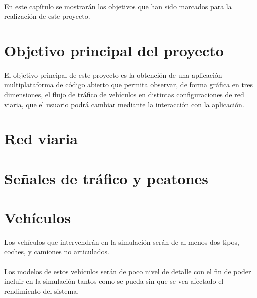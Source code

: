 	\paragraph{}
	En este capítulo se mostrarán los objetivos que han sido marcados para la realización de este proyecto.

\section{Objetivo principal del proyecto}

	\paragraph{}
	El objetivo principal de este proyecto es la obtención de una aplicación multiplataforma de código abierto que permita observar, de forma gráfica en tres dimensiones, el flujo de tráfico de vehículos en distintas configuraciones de red viaria, que el usuario podrá cambiar mediante la interacción con la aplicación.
	
\section{Red viaria}

	\paragraph{}
	

\section{Señales de tráfico y peatones}

	\paragraph{}
	
	
\section{Vehículos}
	
	\paragraph{}
	Los vehículos que intervendrán en la simulación serán de al menos dos tipos, coches, y camiones no articulados.
	
	\paragraph{}
	Los modelos de estos vehículos serán de poco nivel de detalle con el fin de poder incluir en la simulación tantos como se pueda sin que se vea afectado el rendimiento del sistema.
	
